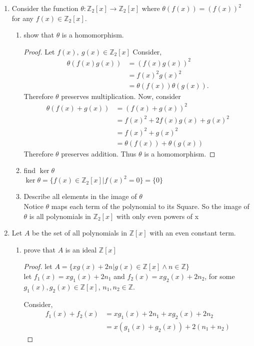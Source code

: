 \documentclass{article}
\newcommand{\Z}{\mathbb{Z}}
\begin{document}
\begin{enumerate}
		\item Consider the function $\theta: \Z_2[x] \to \Z_2[x]$ 
		where $\theta(f(x)) = (f(x))^2$ for any $f(x) \in  \Z_2[x]$.
		\begin{enumerate}
		\item show that $\theta$ is a homomorphism.
		\begin{proof}
		Let $f(x),\ g(x) \in \Z_2[x]$
		Consider, 
		\begin{align*}
			\theta(f(x)g(x))&= (f(x) g(x))^2\\
							&= f(x)^2g(x)^2\\
							&= \theta(f(x))\theta(g(x)).
		\end{align*}
		Therefore $\theta$ preserves multiplication.
		Now, consider 
		\begin{align*}
			\theta(f(x)+g(x)) &= (f(x)+g(x))^2\\ 
							&= f(x)^2 + 2f(x)g(x) +g(x)^2 \\
							&= f(x)^2+g(x)^2\\
							&= \theta(f(x))+\theta(g(x))
		\end{align*}
		Therefore $\theta$ preserves addition. 
		Thus $\theta$ is a homomorphism.
		\end{proof}
		\item find $\ker\theta$\\
		$\ker\theta= \{f(x)\in \Z_2[x]| f(x)^2 = 0\}= \{0\}$

		\item Describe all elements in the image of $\theta$\\ 
		Notice $\theta$ maps each term of the polynomial to its Square.
		So the image of $\theta$ is all polynomials in $\Z_2[x]$ with only even powers of x
		
	\end{enumerate}
	\item Let $A$ be the set of all polynomials in $\Z[x]$ with an even constant term.
	\begin{enumerate}
		\item prove that $A$ is an ideal $\Z[x]$
		\begin{proof}
			let $A = \{ xg(x)+2n|g(x)\in \Z[x] \wedge n \in \Z \}$\\
			let $f_1(x) = xg_1(x)+2n_1$ and $f_2(x) = xg_2(x)+2n_2$, 
			for some $g_1(x), g_2(x) \in \Z[x]$, $n_1, n_2 \in \Z$. 
			
			Consider,
			\begin{align*}
				f_1(x)+f_2(x) &= xg_1(x)+2n_1+xg_2(x)+2n_2 \\
							&= x(g_1(x)+g_2(x))+2(n_1+n_2)
			\end{align*}


\end{proof}
\end{enumerate}
\end{enumerate}
\end{document}
